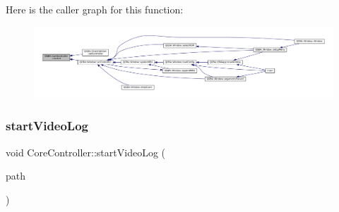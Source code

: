 Here is the caller graph for this function\+:
\nopagebreak
\begin{figure}[H]
\begin{center}
\leavevmode
\includegraphics[width=350pt]{class_q_g_b_a_1_1_core_controller_ab09314b20d031ba7015aafe48bfb8107_icgraph}
\end{center}
\end{figure}
\mbox{\label{class_q_g_b_a_1_1_core_controller_a204fb37311e61673604ab202b4ff06b5}} 
\subsubsection{\texorpdfstring{start\+Video\+Log}{startVideoLog}}
{\footnotesize\ttfamily void Core\+Controller\+::start\+Video\+Log (\begin{DoxyParamCaption}\item[{const Q\+String \&}]{path }\end{DoxyParamCaption})\hspace{0.3cm}{\ttfamily [slot]}}

